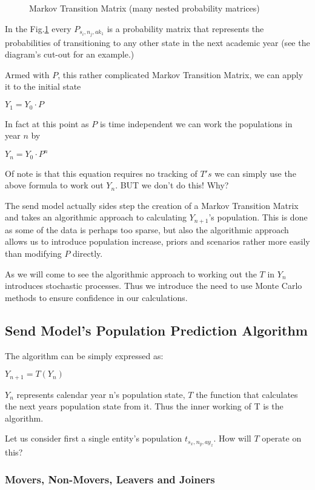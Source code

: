 \documentclass[margin=5mm]{article}
\begin{document}
\begin{figure}[h!]
  \caption{Markov Transition Matrix (many nested probability
    matrices)\label{transition matrix}
  }
\end{figure}

In the Fig.\ref{transition matrix} every $P_{s_i,n_j,ak_1}$ is a
probability matrix that represents the probabilities of transitioning
to any other state in the next academic year (see the diagram's
cut-out for an example.)

Armed with $P$, this rather complicated Markov Transition Matrix, we can
apply it to the initial state

$Y_1 = Y_0 \cdot P$

In fact at this point as $P$ is time independent we can work the
populations in year $n$ by

$Y_n = Y_0 \cdot P^n$

Of note is that this equation requires no tracking of $T's$ we can simply
use the above formula to work out $Y_n$. BUT we don't do this!  Why?

The send model actually sides step the creation of a Markov Transition
Matrix and takes an algorithmic approach to calculating $Y_{n+1}$'s
population.  This is done as some of the data is perhaps too sparse,
but also the algorithmic approach allows us to introduce population
increase, priors and scenarios rather more easily than modifying $P$
directly.

As we will come to see the algorithmic approach to working out the $T$
in $Y_n$ introduces stochastic processes. Thus we introduce the need to use
Monte Carlo methods to ensure confidence in our calculations.

\subsection{Send Model's Population Prediction Algorithm}

The algorithm can be simply expressed as:

$Y_{n+1} = T(Y_n)$

$Y_n$ represents calendar year n's population state, $T$ the function
that calculates the next years population state from it.  Thus the
inner working of T is the algorithm.

Let us consider first a single entity's population $t_{s_x,n_y,ay_z}$.
How will $T$ operate on this?

\subsubsection{Movers,  Non-Movers, Leavers and Joiners}
\end{document}
